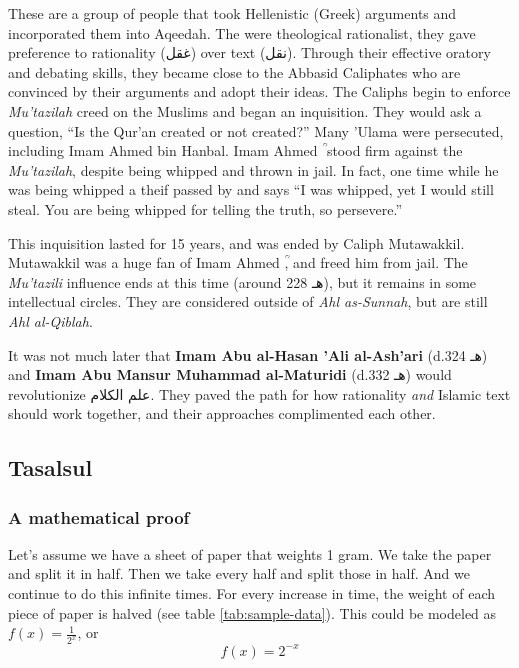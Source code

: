 \documentclass[]{book}
\begin{document}
These are a group of people that took Hellenistic (Greek) arguments and incorporated them into Aqeedah. The were theological rationalist, they gave preference to rationality (غقل) over text (نقل). Through their effective oratory and debating skills, they became close to the Abbasid Caliphates who are convinced by their arguments and adopt their ideas. The Caliphs begin to enforce \emph{Mu'tazilah} creed on the Muslims and began an inquisition. They would ask a question, ``Is the Qur'an created or not created?'' Many 'Ulama were persecuted, including Imam Ahmed bin Hanbal. Imam Ahmed ؒ stood firm against the \emph{Mu'tazilah}, despite being whipped and thrown in jail. In fact, one time while he was being whipped a theif passed by and says ``I was whipped, yet I would still steal. You are being whipped for telling the truth, so persevere.''

This inquisition lasted for 15 years, and was ended by Caliph Mutawakkil. Mutawakkil was a huge fan of Imam Ahmed ؒ, and freed him from jail. The \emph{Mu'tazili} influence ends at this time (around 228 هـ), but it remains in some intellectual circles. They are considered outside of \emph{Ahl as-Sunnah}, but are still \emph{Ahl al-Qiblah}.

It was not much later that \textbf{Imam Abu al-Hasan 'Ali al-Ash'ari} (d.324 هـ) and \textbf{Imam Abu Mansur Muhammad al-Maturidi} (d.332 هـ) would revolutionize علم الكلام. They paved the path for how rationality \emph{and} Islamic text should work together, and their approaches complimented each other.

\hypertarget{tasalsul}{%
\subsection{Tasalsul}\label{tasalsul}}

\hypertarget{a-mathematical-proof}{%
\subsubsection{A mathematical proof}\label{a-mathematical-proof}}

Let's assume we have a sheet of paper that weights 1 gram. We take the paper and split it in half. Then we take every half and split those in half. And we continue to do this infinite times. For every increase in time, the weight of each piece of paper is halved (see table \ref{tab:sample-data}). This could be modeled as \(f(x) = \frac{1}{2^x}\), or
\[
  f(x) = 2^{-x}
  \label{eq:1}
\]
\end{document}
